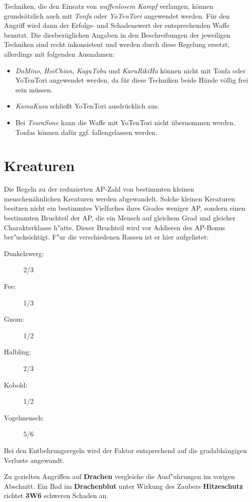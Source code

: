 \documentclass[10pt,a4paper,germanpar]{article}
\begin{document}
Techniken, die den Einsatz von \emph{waffenlosem Kampf} verlangen,
können grundsätzlich auch mit \emph{Tonfa} oder \emph{YoTenTori}
angewendet werden. Für den Angriff wird dann der Erfolgs- und
Schadenswert der entsprechenden Waffe benutzt. Die diesbezüglichen
Angaben in den Beschreibungen der jeweiligen Techniken sind recht
inkonsistent und werden durch diese Regelung ersetzt, allerdings mit
folgenden Ausnahmen:
\begin{itemize}
\item \emph{DoMino}, \emph{HoiChian}, \emph{KaguTobu} und
  \emph{KaruRikiHa} können nicht mit Tonfa oder YoTenTori angewendet
  werden, da für diese Techniken beide Hände völlig frei sein müssen.
\item \emph{KamaKusa} schließt YoTenTori ausdrücklich aus.
\item Bei \emph{TsuraSone} kann die Waffe mit YoTenTori nicht
  übernommen werden. Tonfas können dafür ggf. fallengelassen werden.
\end{itemize}

\section{Kreaturen}

Die Regeln zu der reduzierten AP-Zahl von bestimmten kleinen
menschenähnlichen Kreaturen werden abgewandelt. Solche kleinen
Kreaturen besitzen nicht ein bestimmtes Vielfaches ihres Grades
weniger AP, sondern einen bestimmten Bruchteil der AP, die ein Mensch
auf gleichem Grad und gleicher Charakterklasse h"atte. Dieser
Bruchteil wird vor Addieren des AP-Bonus ber"ucksichtigt. F"ur die
verschiedenen Rassen ist er hier aufgelistet:
\begin{description}
\item[Dunkelzwerg:] 2/3
\item[Fee:] 1/3
\item[Gnom:] 1/2
\item[Halbling:] 2/3
\item[Kobold:] 1/2
\item[Vogelmensch:] 5/6
\end{description}

Bei den Entbehrungsregeln wird der Faktor entsprechend auf die
gradabhängigen Verluste angewandt.

Zu gezielten Angriffen auf \textbf{Drachen} vergleiche die
Ausf"uhrungen im vorigen Abschnitt. Ein Bad im \textbf{Drachenblut}
unter Wirkung des Zaubers \textbf{Hitzeschutz} richtet \textbf{3W6}
schweren Schaden an.
\end{document}
